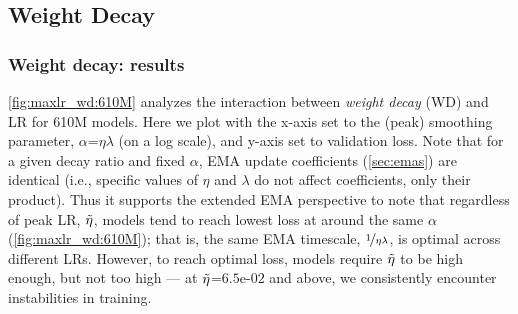
%
%

\subsection{Weight Decay}\label{subsec:wd}

\subsubsection{Weight decay: results}
 



\cref{fig:maxlr_wd:610M} analyzes the interaction between \emph{weight
decay} (WD) and LR for 610M models.
%
Here we plot with the x-axis set to the (peak) smoothing parameter,
$\alpha$=$\eta\lambda$ (on a log scale), and y-axis set to validation
loss.  Note that for a given decay ratio and fixed $\alpha$, EMA
update coefficients (\cref{sec:emas}) are identical (i.e., specific
values of $\eta$ and $\lambda$ do not affect coefficients, only their
product).
%
Thus it supports the extended EMA perspective to note that regardless
of peak LR, $\tilde{\eta}$, models tend to reach lowest loss at around the
same $\alpha$ (\cref{fig:maxlr_wd:610M}); that is, the same EMA
timescale, $\nicefrac{1}{\eta \lambda}$, is optimal across different
LRs.  However, to reach optimal loss, models require $\tilde{\eta}$ to be
high enough, but not too high --- at $\tilde{\eta}$=$6.5$e-$02$ and above,
we consistently encounter instabilities in training.


